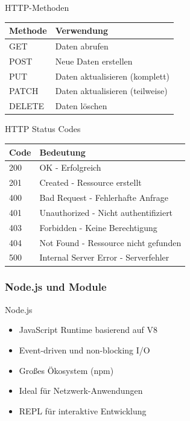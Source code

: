 \begin{theorem}{HTTP-Methoden}
    \begin{center}
    \begin{tabular}{|l|l|}
    \hline
    Methode & Verwendung \\
    \hline
    GET & Daten abrufen \\
    \hline
    POST & Neue Daten erstellen \\
    \hline
    PUT & Daten aktualisieren (komplett) \\
    \hline
    PATCH & Daten aktualisieren (teilweise) \\
    \hline
    DELETE & Daten löschen \\
    \hline
    \end{tabular}
    \end{center}
\end{theorem}

\begin{corollary}{HTTP Status Codes}
    \begin{center}
    \begin{tabular}{|l|l|}
    \hline
    Code & Bedeutung \\
    \hline
    200 & OK - Erfolgreich \\
    \hline
    201 & Created - Ressource erstellt \\
    \hline
    400 & Bad Request - Fehlerhafte Anfrage \\
    \hline
    401 & Unauthorized - Nicht authentifiziert \\
    \hline
    403 & Forbidden - Keine Berechtigung \\
    \hline
    404 & Not Found - Ressource nicht gefunden \\
    \hline
    500 & Internal Server Error - Serverfehler \\
    \hline
    \end{tabular}
    \end{center}
\end{corollary}

\subsubsection{Node.js und Module}

\begin{concept}{Node.js}
    \begin{itemize}
        \item JavaScript Runtime basierend auf V8
        \item Event-driven und non-blocking I/O
        \item Großes Ökosystem (npm)
        \item Ideal für Netzwerk-Anwendungen
        \item REPL für interaktive Entwicklung
    \end{itemize}
\end{concept}

